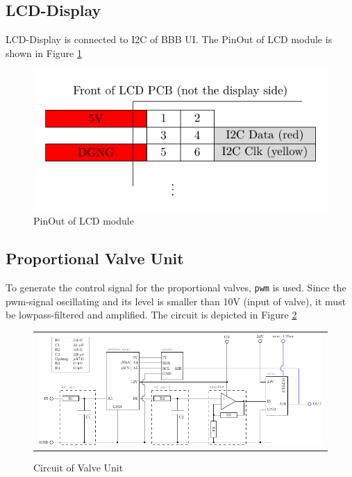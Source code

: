 \documentclass[
	fontsize=10pt
	paper=a4
]{scrartcl}
\begin{document}
\subsection{LCD-Display}

LCD-Display is connected to I2C of BBB UI.
The PinOut of LCD module is shown in Figure \ref{fig:LCD:pinout}

\begin{figure}
\begin{center}
\includegraphics[scale=.8]{Images/LCDDisplay/LCDPins.pdf}
\caption{PinOut of LCD module}
\label{fig:LCD:pinout}
\end{center}
\end{figure}





\subsection{Proportional Valve Unit}

To generate the control signal for the proportional valves, \texttt{pwm} is used.
Since the pwm-signal oscillating and its level is smaller than 10V (input of valve), it must be lowpass-filtered and amplified.
The circuit is depicted in Figure \ref{fig:ValveUnit}

\begin{figure}
\begin{center}
\begin{tabular}{c}
\includegraphics[width=.98\textwidth]{Images/circuit_ValveUnit/circuit_ValveUnit.pdf} \\
\end{tabular}
\end{center}
\caption{Circuit of Valve Unit}
\label{fig:ValveUnit}

\end{figure}
\end{document}
